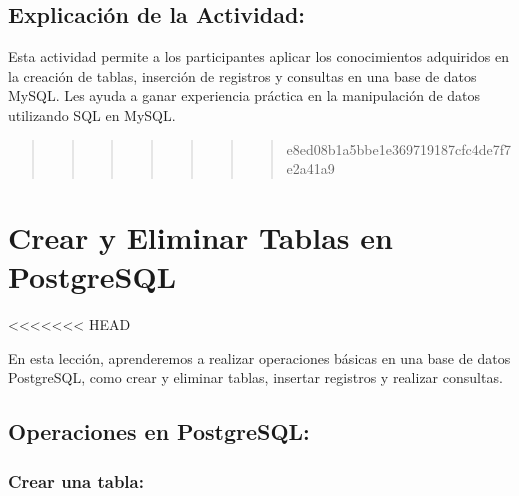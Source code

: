 \documentclass[
  a4paper,
  DIV=11,
  numbers=noendperiod,
  onepage,
  openany]{scrreprt}
\begin{document}
\hypertarget{explicaciuxf3n-de-la-actividad-73}{%
\section{Explicación de la
Actividad:}\label{explicaciuxf3n-de-la-actividad-73}}

Esta actividad permite a los participantes aplicar los conocimientos
adquiridos en la creación de tablas, inserción de registros y consultas
en una base de datos MySQL. Les ayuda a ganar experiencia práctica en la
manipulación de datos utilizando SQL en MySQL.

\begin{quote}
\begin{quote}
\begin{quote}
\begin{quote}
\begin{quote}
\begin{quote}
\begin{quote}
e8ed08b1a5bbe1e369719187cfc4de7f7e2a41a9
\end{quote}
\end{quote}
\end{quote}
\end{quote}
\end{quote}
\end{quote}
\end{quote}

\hypertarget{crear-y-eliminar-tablas-en-postgresql}{%
\chapter{Crear y Eliminar Tablas en
PostgreSQL}\label{crear-y-eliminar-tablas-en-postgresql}}

\textless\textless\textless\textless\textless\textless\textless{} HEAD

En esta lección, aprenderemos a realizar operaciones básicas en una base
de datos PostgreSQL, como crear y eliminar tablas, insertar registros y
realizar consultas.

\hypertarget{operaciones-en-postgresql}{%
\section{Operaciones en PostgreSQL:}\label{operaciones-en-postgresql}}

\hypertarget{crear-una-tabla-4}{%
\subsection{Crear una tabla:}\label{crear-una-tabla-4}}
\end{document}
